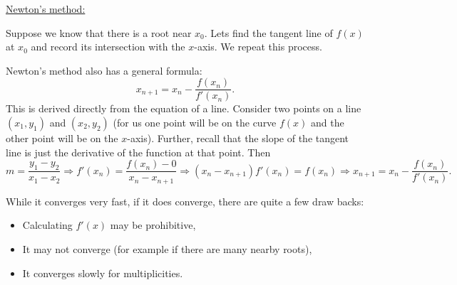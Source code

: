 \documentclass[reqno]{amsart}
\theoremstyle{definition}
\begin{document}
\bigskip

\underline{Newton's method:  }

Suppose we know that there is a root near $x_0$.  Lets find the tangent line of $f(x)$ at $x_0$ and record its intersection with the $x$-axis.  We repeat this process.

Newton's method also has a general formula:
%
\begin{equation*}
x_{n+1} = x_n - \frac{f(x_n)}{f'(x_n)}.
\end{equation*}
%
This is derived directly from the equation of a line.  Consider two points on a line $(x_1, y_1)$ and $(x_2, y_2)$ (for us one point will be on the curve $f(x)$ and the other point will be on the $x$-axis).  Further, recall that the slope of the tangent line is just the derivative of the function at that point.  Then
%
\begin{equation*}
m = \frac{y_1 - y_2}{x_1 - x_2} \Rightarrow f'(x_n) = \frac{f(x_n) - 0}{x_n - x_{n+1}} \Rightarrow (x_n - x_{n+1})f'(x_n) = f(x_n) \Rightarrow x_{n+1} = x_n - \frac{f(x_n)}{f'(x_n)}.
\end{equation*}

While it converges very fast, if it does converge, there are quite a few draw backs:
%
\begin{itemize}

\item  Calculating $f'(x)$ may be prohibitive,
\item  It may not converge (for example if there are many nearby roots),
\item  It converges slowly for multiplicities.

\end{itemize}
\end{document}
